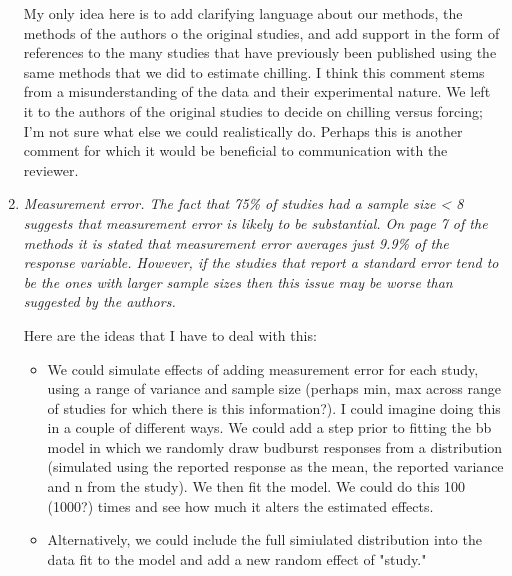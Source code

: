 \documentclass[11pt, a4paper]{article}
\begin{document}
\begin{enumerate}
\par My only idea here is to add clarifying language about our methods, the methods of the authors o the original studies, and add support in the form of references to the many studies that have previously been published using the same methods that we did to estimate chilling. I think this comment stems from a misunderstanding of the data and their experimental nature. We left it to the authors of the original studies to decide on chilling versus forcing; I'm not sure what else we could realistically do. Perhaps this is another comment for which it would be beneficial to communication with the reviewer. 
\item \emph{Measurement error. The fact that 75\% of studies had a sample size < 8 suggests that
measurement error is likely to be substantial. On page 7 of the methods it is stated that
measurement error averages just 9.9\% of the response variable. However, if the studies that
report a standard error tend to be the ones with larger sample sizes then this issue may be
worse than suggested by the authors.}
\par Here are the ideas that I have to deal with this:
\begin{itemize}
\item  We could simulate effects of adding measurement error for each study, using a range of variance and sample size (perhaps min, max across range of studies for which there is this information?). I could imagine doing this in a couple of different ways. We could add a step prior to fitting the bb model in which we randomly draw budburst responses from a distribution (simulated using the reported response as the mean, the reported variance and n from the study). We then fit the model. We could do this 100 (1000?) times and see how much it alters the estimated effects. 
\item Alternatively, we could include the full simiulated distribution into the data fit to the model and add a new random effect of "study."  


\end{itemize}
\end{enumerate}
\end{document}
